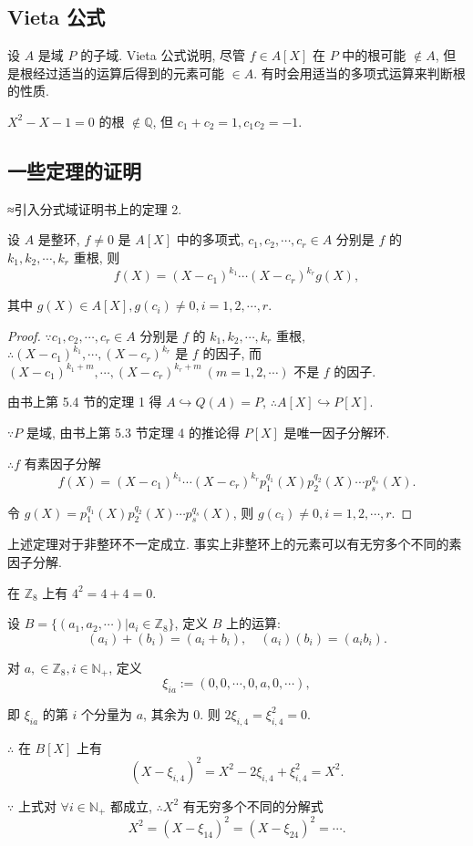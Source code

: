 \documentclass[UTF8]{ctexart}
\begin{document}
\subsection{Vieta 公式}
设 $A$ 是域 $P$ 的子域. Vieta 公式说明, 尽管 $f\in A[X]$ 在 $P$ 中的根可能 $\notin A$, 但是根经过适当的运算后得到的元素可能 $\in A$. 有时会用适当的多项式运算来判断根的性质.
\begin{example}
    $X^2-X-1=0$ 的根 $\notin\mathbb{Q}$, 但 $c_1+c_2=1,c_1c_2=-1$.
\end{example}
\subsection{一些定理的证明}
≈引入分式域证明书上的定理 2.
\begin{theorem}[书上的定理 2]\label{t1.2b}
    设 $A$ 是整环, $f\neq0$ 是 $A[X]$ 中的多项式, $c_1,c_2,\cdots,c_r\in A$ 分别是 $f$ 的 $k_1,k_2,\cdots,k_r$ 重根, 则
    \[f(X)=(X-c_1)^{k_1}\cdots(X-c_r)^{k_r}g(X),\]

    其中 $g(X)\in A[X],g(c_i)\neq0,i=1,2,\cdots,r$.
\end{theorem}
\begin{proof}
    $\because c_1,c_2,\cdots,c_r\in A$ 分别是 $f$ 的 $k_1,k_2,\cdots,k_r$ 重根, $\therefore(X-c_1)^{k_1},\cdots,(X-c_r)^{k_r}$ 是 $f$ 的因子, 而 $(X-c_1)^{k_1+m},\cdots,(X-c_r)^{k_r+m}\ (m=1,2,\cdots)$ 不是 $f$ 的因子.

    由书上第 5.4 节的定理 1 得 $A\hookrightarrow Q(A)=P$, $\therefore A[X]\hookrightarrow P[X]$.

    $\because P$ 是域, 由书上第 5.3 节定理 4 的推论得 $P[X]$ 是唯一因子分解环.

    $\therefore f$ 有素因子分解
    \[f(X)=(X-c_1)^{k_1}\cdots(X-c_r)^{k_r}p_1^{q_1}(X)p_2^{q_2}(X)\cdots p_s^{q_s}(X).\]

    令 $g(X)=p_1^{q_1}(X)p_2^{q_2}(X)\cdots p_s^{q_s}(X)$, 则 $g(c_i)\neq0,i=1,2,\cdots,r$.
\end{proof}
上述定理对于非整环不一定成立. 事实上非整环上的元素可以有无穷多个不同的素因子分解.
\begin{example}
    在 $\mathbb{Z}_8$ 上有 $4^2=4+4=0$.

    设 $B=\{(a_1,a_2,\cdots)|a_i\in\mathbb{Z}_8\}$, 定义 $B$ 上的运算:
    \[(a_i)+(b_i)=(a_i+b_i),\quad(a_i)(b_i)=(a_ib_i).\]

    对 $a,\in\mathbb{Z}_8,i\in\mathbb{N}_+$, 定义
    \[\xi_{ia}:=(0,0,\cdots,0,a,0,\cdots),\]

    即 $\xi_{ia}$ 的第 $i$ 个分量为 $a$, 其余为 $0$. 则 $2\xi_{i,4}=\xi_{i,4}^2=0$.

    $\therefore$ 在 $B[X]$ 上有
    \[(X-\xi_{i,4})^2=X^2-2\xi_{i,4}+\xi_{i,4}^2=X^2.\]

    $\because$ 上式对 $\forall i\in\mathbb{N}_+$ 都成立, $\therefore X^2$ 有无穷多个不同的分解式
    \[X^2=(X-\xi_{14})^2=(X-\xi_{24})^2=\cdots.\]
\end{example}
\end{document}
